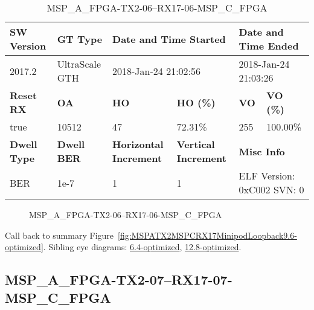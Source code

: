 \begin{table}[h]
\centering
\caption{MSP\_A\_FPGA-TX2-06--RX17-06-MSP\_C\_FPGA}
\label{tab:MSPAFPGATX206RX1706MSPCFPGA9.6-optimized}
\begin{tabular}{@{}|l|l|l|l|l|l|@{}}
\toprule
\textbf{SW Version}                & \textbf{GT Type}   & \multicolumn{2}{l|}{\textbf{Date and Time Started}}            & \multicolumn{2}{l|}{\textbf{Date and Time Ended}}        \\ \midrule
2017.2                       & UltraScale GTH          & \multicolumn{2}{l|}{2018-Jan-24 21:02:56}                   & \multicolumn{2}{l|}{2018-Jan-24 21:03:26}               \\ \midrule
\textbf{Reset RX}                  & \textbf{OA} & \textbf{HO}   & \textbf{HO (\%)} & \textbf{VO} & \textbf{VO (\%)} \\ \midrule
true & 10512        & 47          & 72.31\%        & 255        & 100.00\%       \\ \midrule
\textbf{Dwell Type}                & \textbf{Dwell BER} & \textbf{Horizontal Increment} & \textbf{Vertical Increment}    & \multicolumn{2}{l|}{\textbf{Misc Info}}                  \\ \midrule
BER                            & 1e-7        & 1        & 1           & \multicolumn{2}{l|}{ELF Version: 0xC002 SVN: 0}                         \\ \bottomrule
\end{tabular}
\end{table}

\begin{figure}[h]
\caption{MSP\_A\_FPGA-TX2-06--RX17-06-MSP\_C\_FPGA} \label{fig:MSPAFPGATX206RX1706MSPCFPGA9.6-optimized}
\end{figure}

Call back to summary Figure~\ref{fig:MSPATX2MSPCRX17MinipodLoopback9.6-optimized}.
Sibling eye diagrams: \hyperref[sec:MSPAFPGATX206RX1706MSPCFPGA6.4-optimized]{6.4-optimized}, \hyperref[sec:MSPAFPGATX206RX1706MSPCFPGA12.8-optimized]{12.8-optimized}.

\clearpage
\newpage


\subsection{MSP\_A\_FPGA-TX2-07--RX17-07-MSP\_C\_FPGA}\label{sec:MSPAFPGATX207RX1707MSPCFPGA9.6-optimized}

